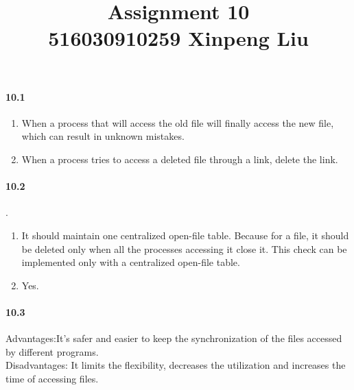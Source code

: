 \documentclass[12pt,a4]{article}
\date{}
\title{
	Assignment 10\\
	\vspace{3mm}
	{\normalsize 516030910259 \textbf{Xinpeng Liu}}
}
\begin{document}
	\maketitle
	\paragraph{10.1} 
		\begin{enumerate}
			\item When a process that will access the old file will finally access the new file, which can result in unknown mistakes.
			\item When a process tries to access a deleted file through a link, delete the link.
		\end{enumerate}
	\paragraph{10.2}.
		\begin{enumerate}
			\item It should maintain one centralized open-file table. Because for a file, it should be deleted only when all the processes accessing it close it. This check can be implemented only with a centralized open-file table.
			\item Yes.
		\end{enumerate}
	\paragraph{10.3}
		Advantages:It's safer and easier to keep the synchronization of the files accessed by different programs.\\
		Disadvantages: It limits the flexibility, decreases the utilization and increases the time of accessing files.
\end{document}
